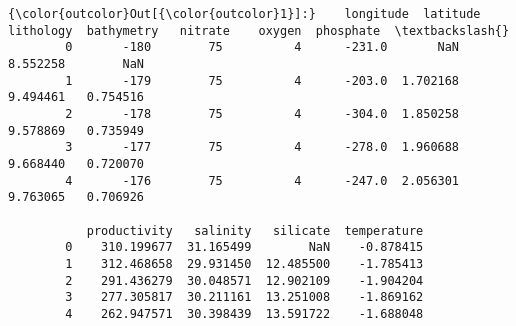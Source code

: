 \documentclass[11pt]{article}
\begin{document}
\begin{Verbatim}[commandchars=\\\{\}]
{\color{outcolor}Out[{\color{outcolor}1}]:}    longitude  latitude  lithology  bathymetry   nitrate    oxygen  phosphate  \textbackslash{}
        0       -180        75          4      -231.0       NaN  8.552258        NaN   
        1       -179        75          4      -203.0  1.702168  9.494461   0.754516   
        2       -178        75          4      -304.0  1.850258  9.578869   0.735949   
        3       -177        75          4      -278.0  1.960688  9.668440   0.720070   
        4       -176        75          4      -247.0  2.056301  9.763065   0.706926   
        
           productivity   salinity   silicate  temperature  
        0    310.199677  31.165499        NaN    -0.878415  
        1    312.468658  29.931450  12.485500    -1.785413  
        2    291.436279  30.048571  12.902109    -1.904204  
        3    277.305817  30.211161  13.251008    -1.869162  
        4    262.947571  30.398439  13.591722    -1.688048  
\end{Verbatim}
            
\end{document}
